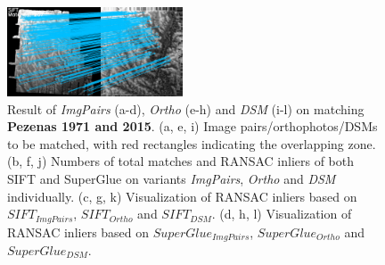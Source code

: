 \begin{figure}[htbp]
\begin{center}
{\begin{minipage}[t]{0.48\linewidth}
				\centering
				\includegraphics[width=5.2cm]{images/Chapitre3/Homol-SIFT2Step-Rough-2DRANSAC_MEC-Malt_Tapas_1971_MEC-Malt_2015.png}
			\end{minipage}%
		}
		\caption{Result of \textit{ImgPairs} (a-d), \textit{Ortho} (e-h) and \textit{DSM} (i-l) on matching \textbf{Pezenas 1971 and 2015}. (a, e, i) Image pairs/orthophotos/DSMs to be matched, with red rectangles indicating the overlapping zone. (b, f, j) Numbers of total matches and RANSAC inliers of both SIFT and SuperGlue on variants \textit{ImgPairs}, \textit{Ortho} and \textit{DSM} individually. (c, g, k) Visualization of RANSAC inliers based on $SIFT_{ImgPairs}$, $SIFT_{Ortho}$ and $SIFT_{DSM}$. (d, h, l) Visualization of RANSAC inliers based on $SuperGlue_{ImgPairs}$, $SuperGlue_{Ortho}$ and $SuperGlue_{DSM}$.}  
		\label{MatchVizPezenas1971DSM}
	\end{center}
\end{figure} 




